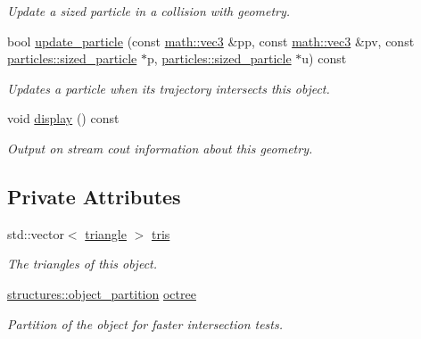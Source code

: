 \begin{DoxyCompactItemize}
\begin{DoxyCompactList}\small\item\em Update a sized particle in a collision with geometry. \end{DoxyCompactList}\item 
bool \hyperlink{classphysim_1_1geometry_1_1object_a6cc02ad82780ef81d62eb3468879dff1}{update\+\_\+particle} (const \hyperlink{structphysim_1_1math_1_1vec3}{math\+::vec3} \&pp, const \hyperlink{structphysim_1_1math_1_1vec3}{math\+::vec3} \&pv, const \hyperlink{classphysim_1_1particles_1_1sized__particle}{particles\+::sized\+\_\+particle} $\ast$p, \hyperlink{classphysim_1_1particles_1_1sized__particle}{particles\+::sized\+\_\+particle} $\ast$u) const
\begin{DoxyCompactList}\small\item\em Updates a particle when its trajectory intersects this object. \end{DoxyCompactList}\item 
\mbox{\label{classphysim_1_1geometry_1_1object_a6c5826f7fb1551cf1234de38c6651917}} 
void \hyperlink{classphysim_1_1geometry_1_1object_a6c5826f7fb1551cf1234de38c6651917}{display} () const
\begin{DoxyCompactList}\small\item\em Output on stream {\itshape cout} information about this geometry. \end{DoxyCompactList}\end{DoxyCompactItemize}
\subsection*{Private Attributes}
\begin{DoxyCompactItemize}
\item 
\mbox{\label{classphysim_1_1geometry_1_1object_a90f3fe1ddb784923e9fd5ff8008b2a0b}} 
std\+::vector$<$ \hyperlink{classphysim_1_1geometry_1_1triangle}{triangle} $>$ \hyperlink{classphysim_1_1geometry_1_1object_a90f3fe1ddb784923e9fd5ff8008b2a0b}{tris}
\begin{DoxyCompactList}\small\item\em The triangles of this object. \end{DoxyCompactList}\item 
\mbox{\label{classphysim_1_1geometry_1_1object_acfaa1a79d6ea460ca98525e71ebb3d1e}} 
\hyperlink{classphysim_1_1structures_1_1object__partition}{structures\+::object\+\_\+partition} \hyperlink{classphysim_1_1geometry_1_1object_acfaa1a79d6ea460ca98525e71ebb3d1e}{octree}
\begin{DoxyCompactList}\small\item\em Partition of the object for faster intersection tests. \end{DoxyCompactList}\end{DoxyCompactItemize}
